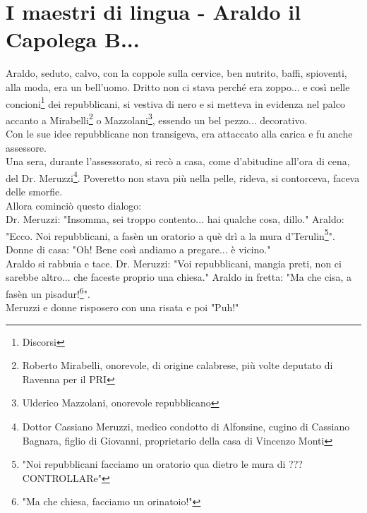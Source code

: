 \documentclass[10pt]{memoir} %
\begin{document}

\chapter{I maestri di lingua - Araldo il Capolega B...}
Araldo, seduto, calvo, con la coppole sulla cervice, ben nutrito, baffi, spioventi, alla moda, era un bell'uomo. Dritto non ci stava perché era zoppo... e così nelle concioni\footnote{Discorsi} dei repubblicani, si vestiva di nero e si metteva in evidenza nel palco accanto a Mirabelli\footnote{Roberto Mirabelli, onorevole, di origine calabrese, più volte deputato di Ravenna per il PRI} o Mazzolani\footnote{Ulderico Mazzolani, onorevole repubblicano}, essendo un bel pezzo... decorativo.\\
Con le sue idee repubblicane non transigeva, era attaccato alla carica e fu anche assessore.\\
Una sera, durante l'assessorato, si recò a casa, come d'abitudine all'ora di cena, del Dr. Meruzzi\footnote{Dottor Cassiano Meruzzi, medico condotto di Alfonsine, cugino di Cassiano Bagnara, figlio di Giovanni, proprietario della casa di Vincenzo Monti}. Poveretto non stava più nella pelle, rideva, si contorceva, faceva delle smorfie.\\
Allora cominciò questo dialogo:\\
Dr. Meruzzi: "Insomma, sei troppo contento... hai qualche cosa, dillo."
Araldo: "Ecco. Noi repubblicani, a fasèn un oratorio a què drì a la mura d'Terulin\footnote{"Noi repubblicani facciamo un oratorio qua dietro le mura di ??? CONTROLLARe"}".\\
Donne di casa: "Oh! Bene così andiamo a pregare... è vicino."\\
Araldo si rabbuia e tace. 
Dr. Meruzzi: "Voi repubblicani, mangia preti, non ci sarebbe altro... che faceste proprio una chiesa."
Araldo in fretta: "Ma che cisa, a fasèn un pisadur!\footnote{"Ma che chiesa, facciamo un orinatoio!"}".\\
Meruzzi e donne risposero con una risata e poi "Puh!"\\
\end{document}
